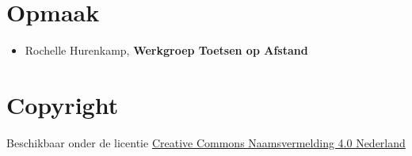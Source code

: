 \documentclass[
]{book}
\providecommand{\tightlist}{%
  \setlength{\itemsep}{0pt}\setlength{\parskip}{0pt}}
\begin{document}
\hypertarget{opmaak}{%
\section{Opmaak}\label{opmaak}}

\begin{itemize}
\tightlist
\item
  Rochelle Hurenkamp, \textbf{Werkgroep Toetsen op Afstand}
\end{itemize}

\hypertarget{copyright}{%
\section{Copyright}\label{copyright}}

Beschikbaar onder de licentie \href{https://creativecommons.org/licenses/by/4.0/deed.nl}{Creative Commons Naamsvermelding 4.0 Nederland}

  
\end{document}
